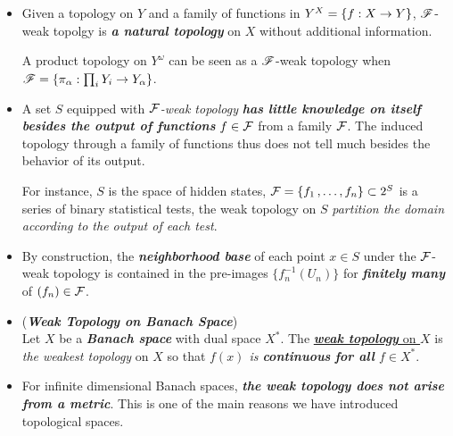 \documentclass[11pt]{article}
\begin{document}
\begin{itemize}
\item \begin{remark}
Given a topology  on $Y$ and a family of functions in $Y^X= \left\{f: X\rightarrow Y\right\}$, ${\mathscr F}$-weak topolgy is \emph{\textbf{a natural topology}} on $X$ without additional information. 

A product topology on $Y^{\omega}$ can be seen as a ${\mathscr F}$-weak topology when ${\mathscr F} = \{\pi_{\alpha}: \prod_{i}Y_i \rightarrow Y_{\alpha} \}$.
\end{remark}

\item \begin{remark}
A set $S$ equipped with \emph{${\mathcal F}$-weak topology} \emph{\textbf{has little knowledge on itself besides the output of functions}} $f \in {\mathcal F}$ from a family ${\mathcal F}$. The induced topology through a family of functions thus does not tell much besides  the behavior of its output. 

For instance, $S$ is the space of hidden states, ${\mathcal F} = \left\{f_1 \,{,}\ldots{,}\, f_n\right\} \subset 2^{S}$ is a series of binary statistical tests, the weak topology on $S$ \emph{partition the domain according to the output of each test}. 
\end{remark}

\item \begin{remark}
By construction,  the \emph{\textbf{neighborhood base}} of each point $x \in S$ under the ${\mathcal F}$-weak topology is contained in the pre-images  $\{f_{n}^{-1}(U_{n})\}$ for \emph{\textbf{finitely many}} of $(f_n) \in {\mathcal F}$.
\end{remark}


\item \begin{definition} (\textbf{\emph{Weak Topology on Banach Space}})\\
Let $X$ be a \emph{\textbf{Banach space}} with dual space $X^{*}$. The \underline{\emph{\textbf{weak topology}} on $X$} is \emph{the weakest topology} on $X$ so that \emph{$f(x)$ is \textbf{continuous} \textbf{for all} $f \in X^{*}$}.
\end{definition}

\item \begin{remark}
For infinite dimensional Banach spaces, \emph{\textbf{the weak topology does not arise from a metric}}. This is one of the main reasons we have introduced topological spaces.
\end{remark}


\end{itemize}
\end{document}
